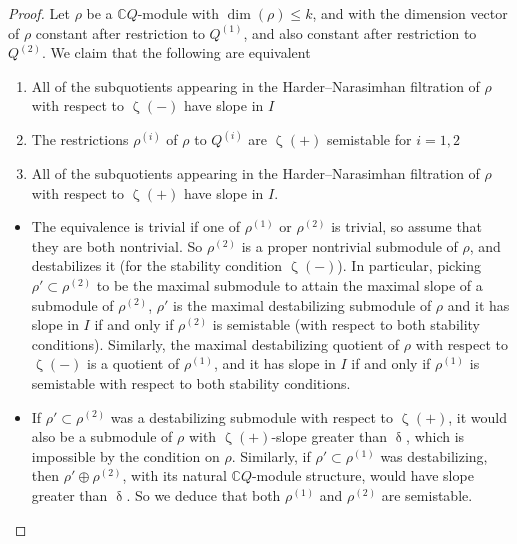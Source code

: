 \documentclass{amsart}
\renewcommand{\delta}{\updelta}
\renewcommand{\zeta}{\upzeta}
\theoremstyle{plain}%
\theoremstyle{definition}
\theoremstyle{remark}
\begin{document}
\begin{proof}
Let $\rho$ be a $\mathbb{C}Q$-module with $\dim(\rho)\leq k$, and with the dimension vector of $\rho$ constant after restriction to $Q^{(1)}$, and also constant after restriction to $Q^{(2)}$. We claim that the following are equivalent
\begin{enumerate}
    \item All of the subquotients appearing in the Harder--Narasimhan filtration of $\rho$ with respect to $\zeta(-)$ have slope in $I$
    \item The restrictions $\rho^{(i)}$ of $\rho$ to $Q^{(i)}$ are $\zeta(+)$ semistable for $i=1,2$
    \item All of the subquotients appearing in the Harder--Narasimhan filtration of $\rho$ with respect to $\zeta(+)$ have slope in $I$.
\end{enumerate}
\begin{itemize}
    \item[$(1)\Leftrightarrow (2)$] The equivalence is trivial if one of $\rho^{(1)}$ or $\rho^{(2)}$ is trivial, so assume that they are both nontrivial.  So $\rho^{(2)}$ is a proper nontrivial submodule of $\rho$, and destabilizes it (for the stability condition $\zeta(-)$).  In particular, picking $\rho'\subset\rho^{(2)}$ to be the maximal submodule to attain the maximal slope of a submodule of $\rho^{(2)}$, $\rho'$ is the maximal destabilizing submodule of $\rho$ and it has slope in $I$ if and only if $\rho^{(2)}$ is semistable (with respect to both stability conditions).  Similarly, the maximal destabilizing quotient of $\rho$ with respect to $\zeta(-)$ is a quotient of $\rho^{(1)}$, and it has slope in $I$ if and only if $\rho^{(1)}$ is semistable with respect to both stability conditions.
    \item[$(3)\Rightarrow (2)$] If $\rho'\subset \rho^{(2)}$ was a destabilizing submodule with respect to $\zeta(+)$, it would also be a submodule of $\rho$ with $\zeta(+)$-slope greater than $\delta$, which is impossible by the condition on $\rho$.  Similarly, if $\rho'\subset \rho^{(1)}$ was destabilizing, then $\rho'\oplus \rho^{(2)}$, with its natural $\mathbb{C}Q$-module structure, would have slope greater than $\delta$.  So we deduce that both $\rho^{(1)}$ and $\rho^{(2)}$ are semistable.

\end{itemize}
\end{proof}
\end{document}

